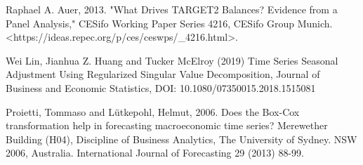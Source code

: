 \documentclass[12pt]{article}
\begin{document}
Raphael A. Auer, 2013. "What Drives TARGET2 Balances? Evidence from a Panel Analysis," CESifo Working Paper Series 4216, CESifo Group Munich. <https://ideas.repec.org/p/ces/ceswps/\_4216.html>. 

Wei Lin, Jianhua Z. Huang and Tucker McElroy (2019) Time Series Seasonal Adjustment Using Regularized Singular Value Decomposition, Journal of Business and Economic Statistics, DOI: 10.1080/07350015.2018.1515081

Proietti, Tommaso and Lütkepohl, Helmut, 2006. Does the Box-Cox transformation help in forecasting macroeconomic time series? Merewether Building (H04), Discipline of Business Analytics, The University of Sydney. NSW 2006, Australia. International Journal of Forecasting 29 (2013) 88-99. 
\end{document}
